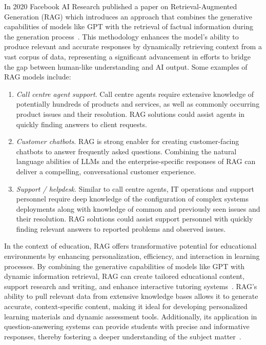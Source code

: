 In 2020 Facebook AI Research published a paper on Retrieval-Augmented Generation (RAG) which introduces an approach that combines the generative capabilities of models like GPT with the retrieval of factual information during the generation process~\cite{lewis2020retrieval}. This methodology enhances the model's ability to produce relevant and accurate responses by dynamically retrieving context from a vast corpus of data, representing a significant advancement in efforts to bridge the gap between human-like understanding and AI output.  Some examples of RAG models include:
\begin{enumerate}
	\item \textit{Call centre agent support}. Call centre agents require extensive knowledge of potentially hundreds of products and services, as well as commonly occurring product issues and their resolution. RAG solutions could assist agents in quickly finding answers to client requests.
	\item \textit{Customer chatbots}. RAG is strong enabler for creating customer-facing chatbots to answer frequently asked questions. Combining the natural language abilities of LLMs and the enterprise-specific responses of RAG can deliver a compelling, conversational customer experience.  
	\item \textit{Support / helpdesk}. Similar to call centre agents, IT operations and support personnel require deep knowledge of the configuration of complex systems deployments along with knowledge of common and previously seen issues and their resolution. RAG solutions could assist support personnel with quickly finding relevant answers to reported problems and observed issues.
\end{enumerate}

In the context of education, RAG offers transformative potential for educational environments by enhancing personalization, efficiency, and interaction in learning processes. By combining the generative capabilities of models like GPT with dynamic information retrieval, RAG can create tailored educational content, support research and writing, and enhance interactive tutoring systems~\cite{lewis2020retrieval}.  RAG's ability to pull relevant data from extensive knowledge bases allows it to generate accurate, context-specific content, making it ideal for developing personalized learning materials and dynamic assessment tools. Additionally, its application in question-answering systems can provide students with precise and informative responses, thereby fostering a deeper understanding of the subject matter~\cite{lewis2020retrieval}.

